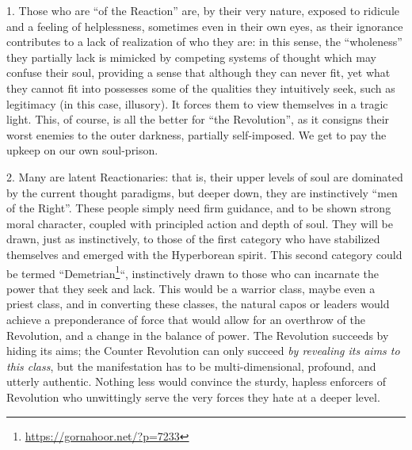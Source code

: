 1. Those who are ``of the Reaction'' are, by their very nature, exposed to ridicule and a feeling of helplessness, sometimes even in their own eyes, as their ignorance contributes to a lack of realization of who they are: in this sense, the ``wholeness'' they partially lack is mimicked by competing systems of thought which may confuse their soul, providing a sense that although they can never fit, yet what they cannot fit into possesses some of the qualities they intuitively seek, such as legitimacy (in this case, illusory). It forces them to view themselves in a tragic light. This, of course, is all the better for ``the Revolution'', as it consigns their worst enemies to the outer darkness, partially self-imposed. We get to pay the upkeep on our own soul-prison.

2. Many are latent Reactionaries: that is, their upper levels of soul are dominated by the current thought paradigms, but deeper down, they are instinctively ``men of the Right''. These people simply need firm guidance, and to be shown strong moral character, coupled with principled action and depth of soul. They will be drawn, just as instinctively, to those of the first category who have stabilized themselves and emerged with the Hyperborean spirit. This second category could be termed ``Demetrian\footnote{\url{https://gornahoor.net/?p=7233}}``, instinctively drawn to those who can incarnate the power that they seek and lack. This would be a warrior class, maybe even a priest class, and in converting these classes, the natural capos or leaders would achieve a preponderance of force that would allow for an overthrow of the Revolution, and a change in the balance of power. The Revolution succeeds by hiding its aims; the Counter Revolution can only succeed \emph{by revealing its aims to this class}, but the manifestation has to be multi-dimensional, profound, and utterly authentic. Nothing less would convince the sturdy, hapless enforcers of Revolution who unwittingly serve the very forces they hate at a deeper level.

